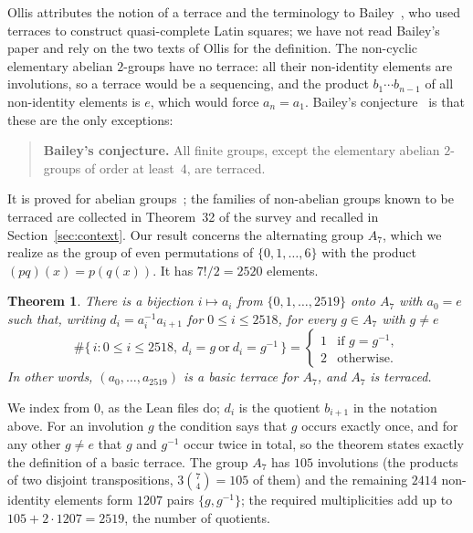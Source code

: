 \documentclass[11pt]{article}
\newtheorem{theorem}{Theorem}
\theoremstyle{definition}
\theoremstyle{remark}
\newcommand{\Alt}{A_7}
\begin{document}
Ollis attributes the notion of a terrace and the terminology to
Bailey~\cite{bailey}, who used terraces to construct quasi-complete Latin
squares; we have not read Bailey's paper and rely on the two texts of
Ollis for the definition. The non-cyclic elementary abelian $2$-groups have
no terrace: all their non-identity elements are involutions, so a terrace
would be a sequencing, and the product $b_1\cdots b_{n-1}$ of all
non-identity elements is $e$, which would force $a_n=a_1$. Bailey's
conjecture~\cite[Conjecture~33]{survey} is that these are the only
exceptions:

\begin{quote}
\textbf{Bailey's conjecture.} All finite groups, except the elementary
abelian $2$-groups of order at least~$4$, are terraced.
\end{quote}

\noindent It is proved for abelian groups~\cite[Theorem~31]{survey}; the
families of non-abelian groups known to be terraced are collected in
Theorem~32 of the survey and recalled in Section~\ref{sec:context}. Our
result concerns the alternating group $\Alt$, which we realize as the group
of even permutations of $\{0,1,\dots,6\}$ with the product
$(pq)(x)=p(q(x))$. It has $7!/2=2520$ elements.

\begin{theorem}\label{thm:main}
There is a bijection $i\mapsto a_i$ from $\{0,1,\dots,2519\}$ onto $\Alt$
with $a_0=e$ such that, writing $d_i=a_i^{-1}a_{i+1}$ for $0\le i\le 2518$,
for every $g\in\Alt$ with $g\ne e$
\[
\#\{\,i : 0\le i\le 2518,\ d_i=g\ \text{or}\ d_i=g^{-1}\,\}=
\begin{cases}1&\text{if } g=g^{-1},\\ 2&\text{otherwise.}\end{cases}
\]
In other words, $(a_0,\dots,a_{2519})$ is a basic terrace for $\Alt$, and
$\Alt$ is terraced.
\end{theorem}

\noindent We index from $0$, as the Lean files do; $d_i$ is the quotient
$b_{i+1}$ in the notation above. For an involution $g$ the condition says that
$g$ occurs exactly once, and for any other $g\ne e$ that $g$ and $g^{-1}$
occur twice in total, so the theorem states exactly the definition of a basic
terrace. The group $\Alt$ has $105$ involutions (the products of two disjoint
transpositions, $3\binom74=105$ of them) and the remaining $2414$
non-identity elements form $1207$ pairs $\{g,g^{-1}\}$; the required
multiplicities add up to $105+2\cdot1207=2519$, the number of quotients.
\end{document}
